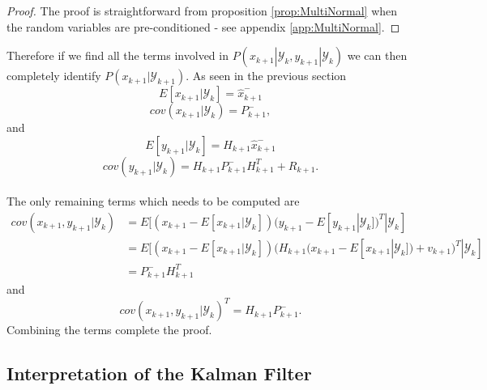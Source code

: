 \documentclass{article}
\theoremstyle{definition}
\theoremstyle{remark}
\newcommand{\filtrationObs}[1]{\ensuremath{\mathscr{Y}_{#1}}}
\begin{document}
\begin{proof}
The proof is straightforward from proposition \ref{prop:MultiNormal} when the random variables are pre-conditioned - see appendix \ref{app:MultiNormal}.
\end{proof}

Therefore if we find all the terms involved in $P(x_{k+1}|\filtrationObs{k},y_{k+1}|\filtrationObs{k})$ we can then completely identify $P(x_{k+1}|\filtrationObs{k+1})$. As seen in the previous section 
$$E[x_{k+1}|\filtrationObs{k}]=\hat{x}_{k+1}^-$$
$$cov(x_{k+1}|\filtrationObs{k})=P_{k+1}^-,$$%
and
$$E[y_{k+1}|\filtrationObs{k}]=H_{k+1}\hat{x}_{k+1}^-$$
$$cov(y_{k+1}|\filtrationObs{k})=H_{k+1}P^-_{k+1}H_{k+1}^T+R_{k+1}.$$
\\
The only remaining terms which needs to be computed are
\begin{align*}
cov(x_{k+1}, y_{k+1}|\filtrationObs{k})&=E[(x_{k+1}-E[x_{k+1}|\filtrationObs{k}])(y_{k+1}-E[y_{k+1}|\filtrationObs{k}])^T|\filtrationObs{k}]\\
&=E[(x_{k+1}-E[x_{k+1}|\filtrationObs{k}])(H_{k+1}(x_{k+1}-E[x_{k+1}|\filtrationObs{k}])+v_{k+1})^T|\filtrationObs{k}]\\
&=P_{k+1}^-H_{k+1}^T
\end{align*}
and
$$cov(x_{k+1},y_{k+1}|\filtrationObs{k})^T=H_{k+1}P_{k+1}^-.$$
Combining the terms complete the proof.









\subsection{Interpretation of the Kalman Filter}
\end{document}
